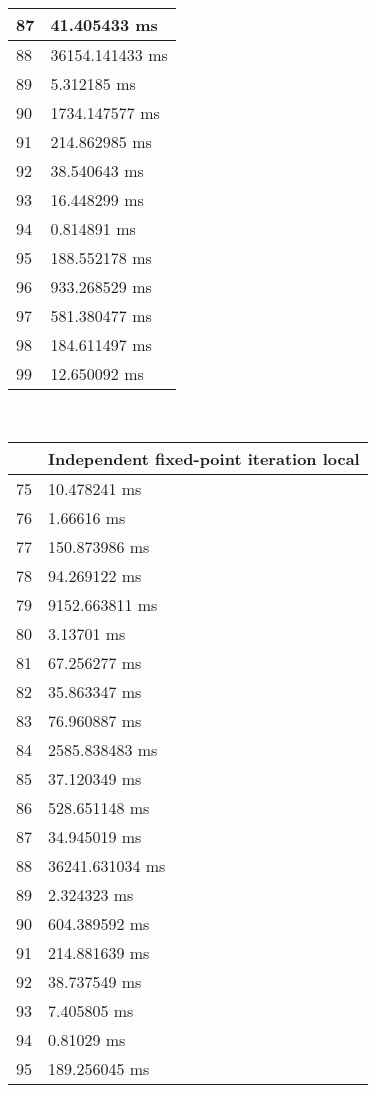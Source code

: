 \begin{multicols}{2}
\begin{tabular}{|l|l|}
		87 & 41.405433 ms \\ \hline
		88 & 36154.141433 ms \\ \hline
		89 & 5.312185 ms \\ \hline
		90 & 1734.147577 ms \\ \hline
		91 & 214.862985 ms \\ \hline
		92 & 38.540643 ms \\ \hline
		93 & 16.448299 ms \\ \hline
		94 & 0.814891 ms \\ \hline
		95 & 188.552178 ms \\ \hline
		96 & 933.268529 ms \\ \hline
		97 & 581.380477 ms \\ \hline
		98 & 184.611497 ms \\ \hline
		99 & 12.650092 ms \\ \hline
	\end{tabular}\\
	\begin{tabular}{|l|l|}
		\hline
		& Independent fixed-point iteration local \\ \hline
		75 & 10.478241 ms \\ \hline
		76 & 1.66616 ms \\ \hline
		77 & 150.873986 ms \\ \hline
		78 & 94.269122 ms \\ \hline
		79 & 9152.663811 ms \\ \hline
		80 & 3.13701 ms \\ \hline
		81 & 67.256277 ms \\ \hline
		82 & 35.863347 ms \\ \hline
		83 & 76.960887 ms \\ \hline
		84 & 2585.838483 ms \\ \hline
		85 & 37.120349 ms \\ \hline
		86 & 528.651148 ms \\ \hline
		87 & 34.945019 ms \\ \hline
		88 & 36241.631034 ms \\ \hline
		89 & 2.324323 ms \\ \hline
		90 & 604.389592 ms \\ \hline
		91 & 214.881639 ms \\ \hline
		92 & 38.737549 ms \\ \hline
		93 & 7.405805 ms \\ \hline
		94 & 0.81029 ms \\ \hline
		95 & 189.256045 ms \\ \hline

\end{tabular}
\end{multicols}

